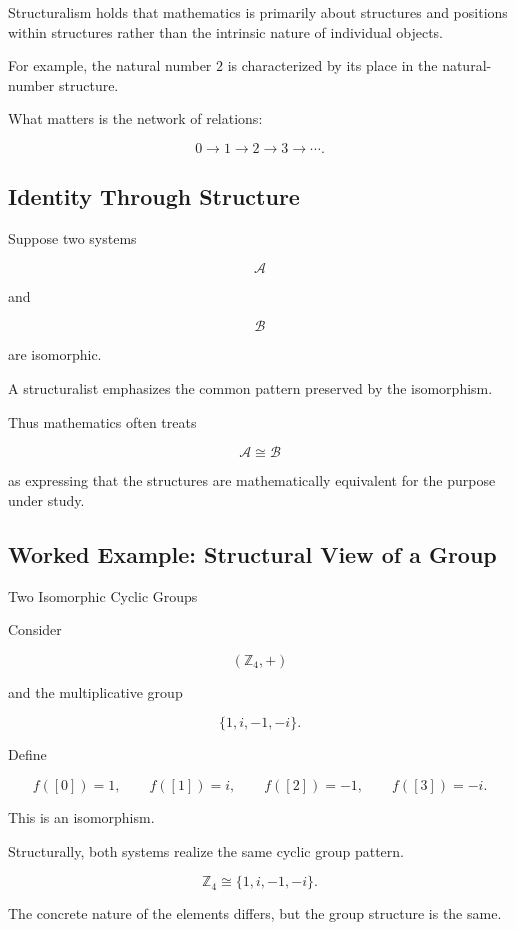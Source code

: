 Structuralism holds that mathematics is primarily about structures and
positions within structures rather than the intrinsic nature of individual
objects.

For example, the natural number \(2\) is characterized by its place in the
natural-number structure.

What matters is the network of relations:

\[
\boxed{
0
\rightarrow
1
\rightarrow
2
\rightarrow
3
\rightarrow
\cdots.
}
\]

\subsection{Identity Through Structure}
\label{subsec:identity-through-structure}

Suppose two systems

\[
\mathcal{A}
\]

and

\[
\mathcal{B}
\]

are isomorphic.

A structuralist emphasizes the common pattern preserved by the
isomorphism.

Thus mathematics often treats

\[
\boxed{
\mathcal{A}\cong\mathcal{B}
}
\]

as expressing that the structures are mathematically equivalent for the
purpose under study.

\subsection{Worked Example: Structural View of a Group}
\label{subsec:worked-structural-group}

\begin{workedexamplebox}{Two Isomorphic Cyclic Groups}

Consider

\[
(\mathbb{Z}_4,+)
\]

and the multiplicative group

\[
\{1,i,-1,-i\}.
\]

Define

\[
f([0])=1,
\qquad
f([1])=i,
\qquad
f([2])=-1,
\qquad
f([3])=-i.
\]

This is an isomorphism.

Structurally, both systems realize the same cyclic group pattern.

\begin{answerbox}
\[
\boxed{
\mathbb{Z}_4
\cong
\{1,i,-1,-i\}.
}
\]
\end{answerbox}

The concrete nature of the elements differs, but the group structure is the
same.

\end{workedexamplebox}

